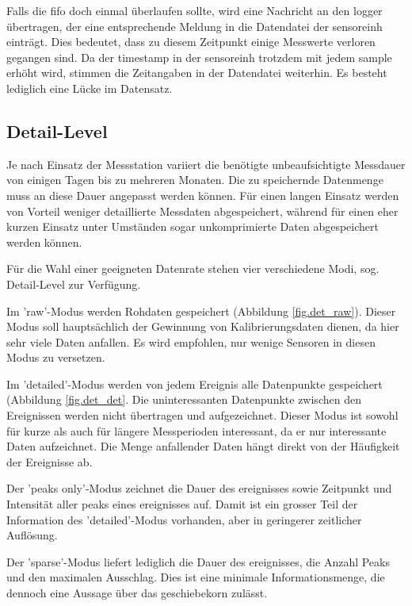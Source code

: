 Falls die \gls{fifo} doch einmal überlaufen sollte, wird eine Nachricht an den \gls{logger} übertragen, der eine entsprechende Meldung in die Datendatei der \gls{sensoreinh} einträgt. Dies bedeutet, dass zu diesem Zeitpunkt einige Messwerte verloren gegangen sind. Da der \gls{timestamp} in der \gls{sensoreinh} trotzdem mit jedem \gls{sample} erhöht wird, stimmen die Zeitangaben in der Datendatei weiterhin. Es besteht lediglich eine Lücke im Datensatz.


\subsection{Detail-Level}
Je nach Einsatz der Messstation variiert die benötigte unbeaufsichtigte Messdauer von einigen Tagen bis zu mehreren Monaten. Die zu speichernde Datenmenge muss an diese Dauer angepasst werden können. Für einen langen Einsatz werden von Vorteil weniger detaillierte Messdaten abgespeichert, während für einen eher kurzen Einsatz unter Umständen sogar unkomprimierte Daten abgespeichert werden können.

Für die Wahl einer geeigneten Datenrate stehen vier verschiedene Modi, sog. Detail-Level zur Verfügung. 

Im 'raw'-Modus werden Rohdaten gespeichert (Abbildung \ref{fig.det_raw}). Dieser Modus soll hauptsächlich der Gewinnung von Kalibrierungsdaten dienen, da hier sehr viele Daten anfallen. Es wird empfohlen, nur wenige Sensoren in diesen Modus zu versetzen.

Im 'detailed'-Modus werden von jedem Ereignis alle Datenpunkte gespeichert (Abbildung \ref{fig.det_det}. Die uninteressanten Datenpunkte zwischen den Ereignissen werden nicht übertragen und aufgezeichnet. Dieser Modus ist sowohl für kurze als auch für längere Messperioden interessant, da er nur interessante Daten aufzeichnet. Die Menge anfallender Daten hängt direkt von der Häufigkeit der Ereignisse ab.

Der 'peaks only'-Modus zeichnet die Dauer des \gls{ereignis}ses sowie Zeitpunkt und Intensität aller \gls{peak}s eines \gls{ereignis}ses auf. Damit ist ein grosser Teil der Information des 'detailed'-Modus vorhanden, aber in geringerer zeitlicher Auflösung.

Der 'sparse'-Modus liefert lediglich die Dauer des \gls{ereignis}ses, die Anzahl Peaks und den maximalen Ausschlag. Dies ist eine minimale Informationsmenge, die dennoch eine Aussage über das \gls{geschiebekorn} zulässt.

